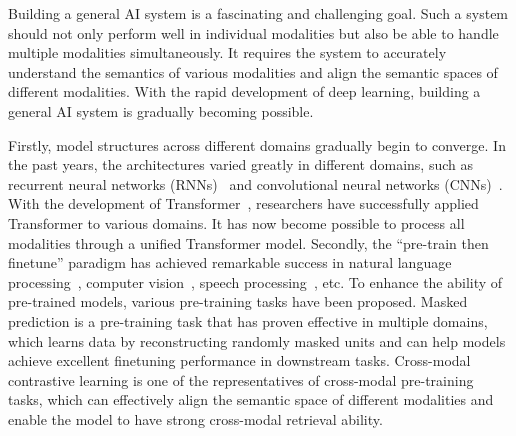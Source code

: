Building a general AI system is a fascinating and challenging goal. Such a system should not only perform well in individual modalities but also be able to handle multiple modalities simultaneously. It requires the system to accurately understand the semantics of various modalities and align the semantic spaces of different modalities. With the rapid development of deep learning, building a general AI system is gradually becoming possible.




Firstly, model structures across different domains gradually begin to converge. In the past years, the architectures varied greatly in different domains, such as recurrent neural networks (RNNs)~\cite{rnn} and convolutional neural networks (CNNs)~\cite{mnist}.  With the development of Transformer~\cite{transformer,vit}, researchers have successfully applied Transformer to various domains.  It has now become possible to process all modalities through a unified Transformer model.
Secondly, the “pre-train then finetune” paradigm has achieved remarkable success in natural language processing~\cite{bert,gpt,gpt3,electra,roberta,deberta,xlnet,bart,T5}, computer vision~\cite{beit,mae,ibot,moco,mocov2,mocov3,simclr}, speech processing~\cite{wav2vec,wav2vec2,wavlm,hubert}, etc. To enhance the ability of pre-trained models, various pre-training tasks have been proposed. Masked prediction is a pre-training task that has proven effective in multiple domains, which learns data by reconstructing randomly masked units and can help models achieve excellent finetuning performance in downstream tasks. Cross-modal contrastive learning is one of the representatives of cross-modal pre-training tasks, which can effectively align the semantic space of different modalities and enable the model to have strong cross-modal retrieval ability.

